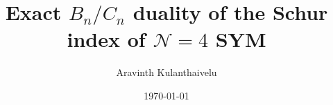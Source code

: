 \documentclass[11pt,letterpaper]{amsart}
\title[$B_n/C_n$ duality of the Schur index]{Exact $B_n/C_n$ duality of the
Schur index of $\mathcal N=4$ SYM}
\author{Aravinth Kulanthaivelu}
\date{\today}
\numberwithin{equation}{section}
\begin{document}
\begin{abstract}
  
\end{abstract}
\maketitle
\tableofcontents
\setlength{\parskip}{10pt}
\raggedbottom





\appendix






\end{document}
